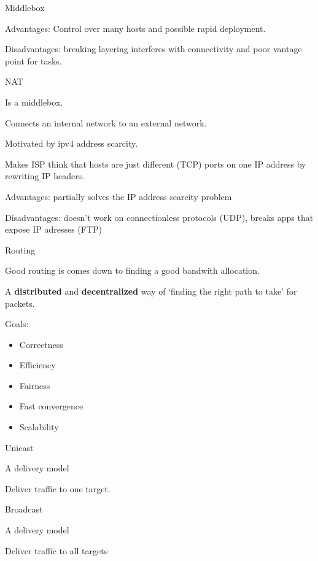 \documentclass[main.tex]{subfiles}
\begin{document}
\begin{card}{Middlebox}
\item Advantages: Control over many hosts and possible rapid deployment.
\item Disadvantages: breaking layering interferes with connectivity and poor vantage point for tasks.
\end{card}

\begin{card}{NAT}
\item Is a middlebox.
\item Connects an internal network to an external network.
\item Motivated by ipv4 address scarcity.
\item Makes ISP think that hosts are just different (TCP) ports on one IP address by rewriting IP headers.
\item Advantages: partially solves the IP address scarcity problem
\item Disadvantages: doesn't work on connectionless protocols (UDP), breaks apps that expose IP adresses (FTP)
\end{card}

\begin{card}{Routing}
\item Good routing is comes down to finding a good bandwith allocation.
\item A \textbf{distributed} and \textbf{decentralized} way of `finding the right path to take' for packets.
\item Goals:
    \begin{itemize}
        \item Correctness
        \item Efficiency
        \item Fairness
        \item Fast convergence
        \item Scalability
    \end{itemize}
\end{card}

\begin{card}{Unicast}
\item A delivery model
\item Deliver traffic to one target.
\end{card}

\begin{card}{Broadcast}
\item A delivery model
\item Deliver traffic to all targets
\end{card}
\end{document}
